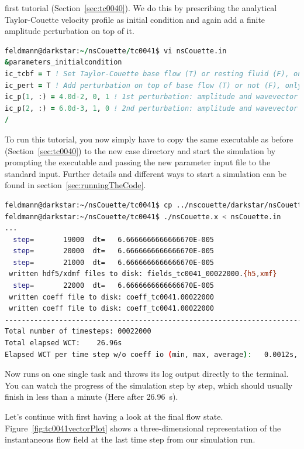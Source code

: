\documentclass[a4paper, 11pt, DIV=11]{scrartcl}
\begin{document}
first tutorial (Section~\ref{sec:tc0040}). We do this by prescribing the analytical
Taylor-Couette velocity profile as initial condition and again add a finite
amplitude perturbation on top of it.
\begin{lstlisting}[language=Fortran]
feldmann@darkstar:~/nsCouette/tc0041$ vi nsCouette.in
&parameters_initialcondition
ic_tcbf = T ! Set Taylor-Couette base flow (T) or resting fluid (F), only when restart = 0
ic_pert = T ! Add perturbation on top of base flow (T) or not (F), only when restart = 0
ic_p(1, :) = 4.0d-2, 0, 1 ! 1st perturbation: amplitude and wavevector (a1, k_th1, k_z1)
ic_p(2, :) = 6.0d-3, 1, 0 ! 2nd perturbation: amplitude and wavevector (a2, k_th2, k_z2)
/
\end{lstlisting}
To run this tutorial, you now simply have to copy the same executable as before
(Section~\ref{sec:tc0040}) to the new case directory and start the simulation by
prompting the executable and passing the new parameter input file to the standard input.
Further details and different ways to start a simulation can be found in
section~\ref{sec:runningTheCode}. 
\begin{lstlisting}[language=bash]
feldmann@darkstar:~/nsCouette/tc0041$ cp ../nscouette/darkstar/nsCouette.x .
feldmann@darkstar:~/nsCouette/tc0041$ ./nsCouette.x < nsCouette.in
...
  step=       19000  dt=   6.6666666666666670E-005
  step=       20000  dt=   6.6666666666666670E-005
  step=       21000  dt=   6.6666666666666670E-005
 written hdf5/xdmf files to disk: fields_tc0041_00022000.{h5,xmf}
  step=       22000  dt=   6.6666666666666670E-005
 written coeff file to disk: coeff_tc0041.00022000                   
 written coeff file to disk: coeff_tc0041.00022000                   
------------------------------------------------------------------------------------
Total number of timesteps: 00022000
Total elapsed WCT:    26.96s
Elapsed WCT per time step w/o coeff io (min, max, average):   0.0012s,    0.0012s,    0.0012s
\end{lstlisting}
Now \nsc runs on one single \mpi task and throws its log output directly
to the terminal. You can watch the progress of the simulation step by step,
which should usually finish in less than a minute (Here after \SI{26.96}{\second}).
\par
Let's continue with first having a look at the final flow state.
Figure~\ref{fig:tc0041vectorPlot} shows a three-dimensional representation
of the instantaneous flow field at the last time step from our simulation run.
\end{document}
